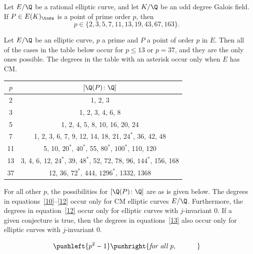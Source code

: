 \begin{frame}[plain,c]
\begin{lem}
Let $E/\Q$ be a rational elliptic curve, and let $K/\Q$ be an odd degree Galois field. If $P \in E(K)_\tors$ is a point of prime order $p$, then
	\[
	p \in \{ 2, 3, 5, 7, 11, 13, 19, 43, 67, 163 \}.
	\]
\end{lem}
\end{frame}





\begin{frame}[plain,c]
\tiny
\begin{thm} 
Let $E/\Q$ be an elliptic curve, $p$ a prime and $P$ a point of order $p$ in $E$. Then all of the cases in the table below occur for $p \leq 13$ or $p= 37$, and they are the only ones possible. The degrees in the table with an asterisk occur only when $E$ has CM.
	\begin{table}[!ht]
	\centering
	\label{tab:degreetab}
	\begin{tabular}{|c|c|} \hline
	$p$ & $[\Q(P) \colon \Q]$ \\ \hline
	2 & 1, 2, 3 \\ \hline
	3 & 1, 2, 3, 4, 6, 8 \\ \hline
	5 & 1, 2, 4, 5, 8, 10, 16, 20, 24 \\ \hline
	7 & 1, 2, 3, 6, 7, 9, 12, 14, 18, 21, $24^*$, 36, 42, 48 \\ \hline
	11 & 5, 10, $20^*$, $40^*$, 55, $80^*$, $100^*$, 110, 120 \\ \hline
	13 & 3, 4, 6, 12, $24^*$, 39, $48^*$, 52, 72, 78, 96, $144^*$, 156, 168 \\ \hline
	37 & 12, 36, $72^*$, 444, $1296^*$, 1332, 1368 \\ \hline
	\end{tabular}
	\end{table}
For all other $p$, the possibilities for $[\Q(P) \colon \Q]$ are as is given below. The degrees in equations~\ref{10}--\ref{12} occur only for CM elliptic curves $E/\Q$. Furthermore, the degrees in equation~\ref{12} occur only for elliptic curves with $j$-invariant 0. If a given conjecture is true, then the degrees in equations~\ref{13} also occur only for elliptic curves with $j$-invariant 0.
	\begin{align} 
	\pushleft{p^2 - 1} & \pushright{\text{\itshape for all } p,\quad\quad\quad}  \label{8} \\[-1em]

\end{align}
\end{thm}
\end{frame}
